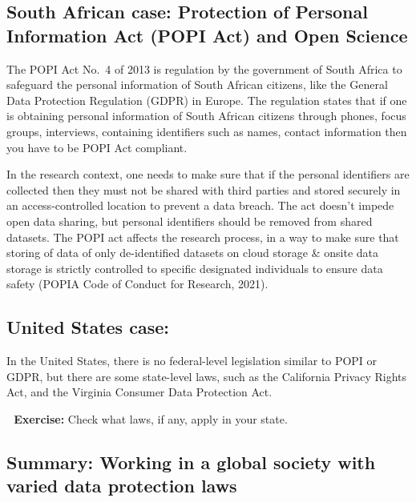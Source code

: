 \documentclass[
  letterpaper,
  DIV=11,
  numbers=noendperiod]{scrreport}
\begin{document}
\hypertarget{south-african-case-protection-of-personal-information-act-popi-act-and-open-science}{%
\subsection{South African case: Protection of Personal Information Act
(POPI Act) and Open
Science}\label{south-african-case-protection-of-personal-information-act-popi-act-and-open-science}}

The POPI Act No.~4 of 2013 is regulation by the government of South
Africa to safeguard the personal information of South African citizens,
like the General Data Protection Regulation (GDPR) in Europe. The
regulation states that if one is obtaining personal information of South
African citizens through phones, focus groups, interviews, containing
identifiers such as names, contact information then you have to be POPI
Act compliant.

In the research context, one needs to make sure that if the personal
identifiers are collected then they must not be shared with third
parties and stored securely in an access-controlled location to prevent
a data breach. The act doesn't impede open data sharing, but personal
identifiers should be removed from shared datasets. The POPI act affects
the research process, in a way to make sure that storing of data of only
de-identified datasets on cloud storage \& onsite data storage is
strictly controlled to specific designated individuals to ensure data
safety (POPIA Code of Conduct for Research, 2021).

\hypertarget{united-states-case}{%
\subsection{United States case:}\label{united-states-case}}

In the United States, there is no federal-level legislation similar to
POPI or GDPR, but there are some state-level laws, such as the
California Privacy Rights Act, and the Virginia Consumer Data Protection
Act.

\textbf{📝 Exercise:} Check what laws, if any, apply in your state.

\hypertarget{summary-working-in-a-global-society-with-varied-data-protection-laws}{%
\subsection{Summary: Working in a global society with varied data
protection
laws}\label{summary-working-in-a-global-society-with-varied-data-protection-laws}}
\end{document}
